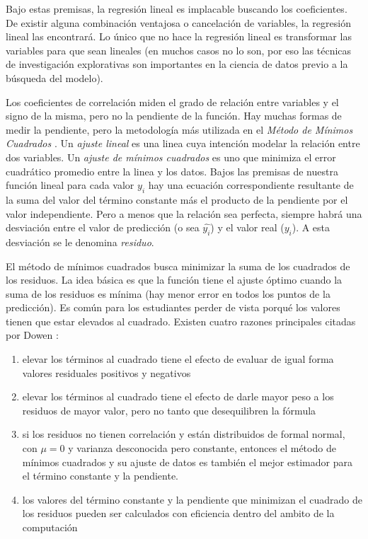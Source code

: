 \documentclass[letterpaper, spanish, 11pt]{report}
\begin{document}
Bajo estas premisas, la regresión lineal es implacable buscando los coeficientes. De existir alguna combinación ventajosa o cancelación de variables, la regresión lineal las encontrará. Lo único que no hace la regresión lineal es transformar las variables para que sean lineales (en muchos casos no lo son, por eso las técnicas de investigación explorativas son importantes en la ciencia de datos previo a la búsqueda del modelo).

Los coeficientes de correlación miden el grado de relación entre variables y el signo de la misma, pero no la pendiente de la función. Hay muchas formas de medir la pendiente, pero la metodología más utilizada en el \emph{Método de Mínimos Cuadrados} \cite{thinkStats}. Un \emph{ajuste lineal} es una linea cuya intención modelar la relación entre dos variables. Un \emph{ajuste de mínimos cuadrados} es uno que minimiza el error cuadrático promedio entre la linea y los datos. Bajos las premisas de nuestra función lineal para cada valor $y_{i}$ hay una ecuación correspondiente resultante de la suma del valor del término constante más el producto de la pendiente por el valor independiente. Pero a menos que la relación sea perfecta, siempre habrá una desviación entre el valor de predicción (o sea $\hat{y_{i}}$) y el valor real ($y_{i}$). A esta desviación se le denomina \emph{residuo}.

El método de mínimos cuadrados busca minimizar la suma de los cuadrados de los residuos. La idea básica es que la función tiene el ajuste óptimo cuando la suma de los residuos es mínima (hay menor error en todos los puntos de la predicción). Es común para los estudiantes perder de vista porqué los valores tienen que estar elevados al cuadrado. Existen cuatro razones principales citadas por Dowen \cite{thinkStats}:

\begin{enumerate}
	\item elevar los términos al cuadrado tiene el efecto de evaluar de igual forma valores residuales positivos y negativos
	\item elevar los términos al cuadrado tiene el efecto de darle mayor peso a los residuos de mayor valor, pero no tanto que desequilibren la fórmula
	\item si los residuos no tienen correlación y están distribuidos de formal normal, con $\mu = 0$ y varianza desconocida pero constante, entonces el método de mínimos cuadrados y su ajuste de datos es también el mejor estimador para el término constante y la pendiente.
	\item los valores del término constante y la pendiente que minimizan el cuadrado de los residuos pueden ser calculados con eficiencia dentro del ambito de la computación
\end{enumerate}
\end{document}
